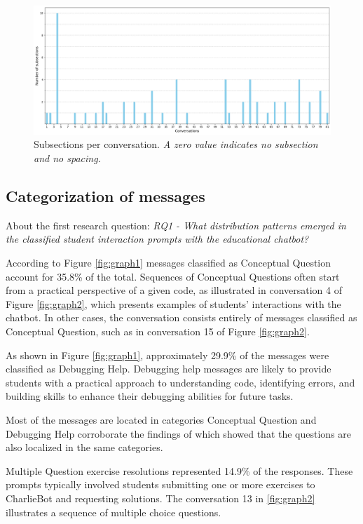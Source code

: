 \documentclass[a4paper,twoside]{article}
\begin{document}
\begin{figure}[htbp]
  \centering
  \includegraphics[scale=0.39]{img/figure3.png}
  \caption{Subsections per conversation. \textit{A zero value indicates
  no subsection and no spacing.}}
  \label{fig:graph3}
\end{figure}

\subsection{Categorization of messages}

About the first research question: \textit{RQ1 - What distribution patterns
emerged in the classified student interaction prompts with the educational
chatbot?}

According to Figure \ref{fig:graph1} messages classified as
Conceptual Question account for 35.8\% of the total. Sequences of Conceptual
Questions often start from a practical perspective of a given code, as
illustrated in conversation 4 of Figure \ref{fig:graph2}, which presents
examples of students' interactions with the chatbot. In other cases, the
conversation consists entirely of messages classified as Conceptual Question,
such as in conversation 15 of Figure \ref{fig:graph2}.

As shown in Figure \ref{fig:graph1}, approximately 29.9\% of the messages were
classified as Debugging Help. Debugging help messages are likely to provide
students with a practical approach to understanding code, identifying errors,
and building skills to enhance their debugging abilities for future tasks.

Most of the messages are located in categories Conceptual Question and Debugging
Help corroborate the findings of \cite{Ghimire24} which showed that the
questions are also localized in the same categories.

Multiple Question exercise resolutions represented 14.9\% of the responses.
These prompts typically involved students submitting one or more exercises to
CharlieBot and requesting solutions. The conversation 13 in \ref{fig:graph2}
illustrates a sequence of multiple choice questions.
\end{document}

